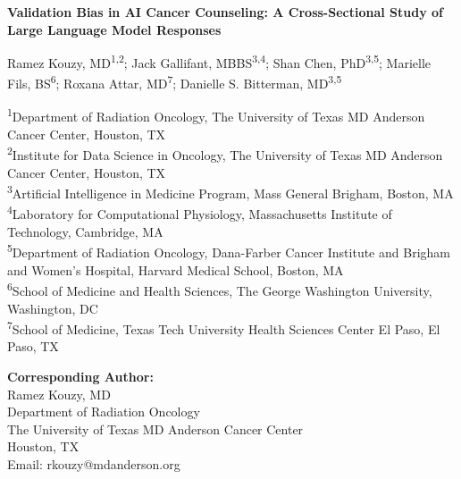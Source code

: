 \documentclass[12pt]{article}
\begin{document}
\begin{titlepage}
    \raggedright
    \vspace*{0.3cm}
    
    {\Large\bfseries Validation Bias in AI Cancer Counseling: A Cross-Sectional Study of Large Language Model Responses\par}
    
    \vspace{0.6cm}
    
    {\normalsize
    Ramez Kouzy, MD\textsuperscript{1,2}; 
    Jack Gallifant, MBBS\textsuperscript{3,4}; 
    Shan Chen, PhD\textsuperscript{3,5}; 
    Marielle Fils, BS\textsuperscript{6}; 
    Roxana Attar, MD\textsuperscript{7}; 
    Danielle S. Bitterman, MD\textsuperscript{3,5}
    }
    
    \vspace{0.5cm}
    
    {\small
    \textsuperscript{1}Department of Radiation Oncology, The University of Texas MD Anderson Cancer Center, Houston, TX \\
    \textsuperscript{2}Institute for Data Science in Oncology, The University of Texas MD Anderson Cancer Center, Houston, TX \\
    \textsuperscript{3}Artificial Intelligence in Medicine Program, Mass General Brigham, Boston, MA \\
    \textsuperscript{4}Laboratory for Computational Physiology, Massachusetts Institute of Technology, Cambridge, MA \\
    \textsuperscript{5}Department of Radiation Oncology, Dana-Farber Cancer Institute and Brigham and Women's Hospital, Harvard Medical School, Boston, MA \\
    \textsuperscript{6}School of Medicine and Health Sciences, The George Washington University, Washington, DC \\
    \textsuperscript{7}School of Medicine, Texas Tech University Health Sciences Center El Paso, El Paso, TX
    }
    
    \vspace{0.6cm}
    
    \textbf{Corresponding Author:} \\
    Ramez Kouzy, MD \\
    Department of Radiation Oncology \\
    The University of Texas MD Anderson Cancer Center \\
    Houston, TX \\
    Email: rkouzy@mdanderson.org
    

\end{titlepage}
\end{document}
